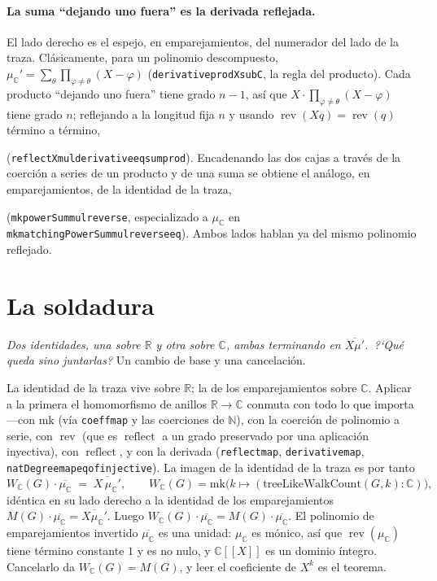 \documentclass[11pt]{article}
\newcommand{\lean}[1]{{\def\_{\textunderscore\allowbreak}\texttt{#1}}}
\newcommand{\R}{\mathbb{R}}
\newcommand{\C}{\mathbb{C}}
\newcommand{\N}{\mathbb{N}}
\DeclareMathOperator{\reflect}{reflect}
\DeclareMathOperator{\rev}{rev}
\providecommand{\llbracket}{[\![}
\providecommand{\rrbracket}{]\!]}
\newcommand{\keyeq}[1]{\begin{center}\keybox{$\displaystyle #1$}\end{center}}
\begin{document}
\paragraph{La suma ``dejando uno fuera'' es la derivada reflejada.} El lado derecho es el espejo, en
emparejamientos, del numerador del lado de la traza. Cl\'asicamente, para un polinomio descompuesto,
$\mu_\C'=\sum_\theta\prod_{\varphi\neq\theta}(X-\varphi)$ (\lean{derivative\_prod\_X\_sub\_C}, la regla
del producto). Cada producto ``dejando uno fuera'' tiene grado $n-1$, as\'i que
$X\cdot\prod_{\varphi\neq\theta}(X-\varphi)$ tiene grado $n$; reflejando a la longitud fija $n$ y
usando $\rev(Xq)=\rev(q)$ t\'ermino a t\'ermino,
\keyeq{\sum_\theta\prod_{\varphi\neq\theta}(1-\varphi X)\;=\;\reflect_n\!\bigl(X\,\mu_\C'\bigr)}
(\lean{reflect\_X\_mul\_derivative\_eq\_sum\_prod}). Encadenando las dos cajas a trav\'es de la
coerci\'on a series de un producto y de una suma se obtiene el an\'alogo, en emparejamientos, de la
identidad de la traza,
\keyeq{M(G)\cdot\overline{\mu_\C}\;=\;\overline{X\,\mu_\C'}}
(\lean{mk\_powerSum\_mul\_reverse}, especializado a $\mu_\C$ en
\lean{mk\_matchingPowerSum\_mul\_reverse\_eq}). Ambos lados hablan ya del mismo polinomio reflejado.

\section{La soldadura}
\label{sec:weld}

\emph{Dos identidades, una sobre $\R$ y otra sobre $\C$, ambas terminando en $\overline{X\mu'}$.
\,?`Qu\'e queda sino juntarlas?} Un cambio de base y una cancelaci\'on.

La identidad de la traza vive sobre $\R$; la de los emparejamientos sobre $\C$. Aplicar a la primera el
homomorfismo de anillos $\R\to\C$ conmuta con todo lo que importa---con $\mathrm{mk}$ (v\'ia
\lean{coeff\_map} y las coerciones de $\N$), con la coerci\'on de polinomio a serie, con $\rev$ (que es
$\reflect$ a un grado preservado por una aplicaci\'on inyectiva), con $\reflect$, y con la derivada
(\lean{reflect\_map}, \lean{derivative\_map}, \lean{natDegree\_map\_eq\_of\_injective}). La imagen de la
identidad de la traza es por tanto
\[
  W_\C(G)\cdot\overline{\mu_\C}\;=\;\overline{X\,\mu_\C'},
  \qquad W_\C(G)=\mathrm{mk}\bigl(k\mapsto(\mathrm{treeLikeWalkCount}(G,k):\C)\bigr),
\]
id\'entica en su lado derecho a la identidad de los emparejamientos
$M(G)\cdot\overline{\mu_\C}=\overline{X\mu_\C'}$. Luego
$W_\C(G)\cdot\overline{\mu_\C}=M(G)\cdot\overline{\mu_\C}$. El polinomio de emparejamientos invertido
$\overline{\mu_\C}$ es una unidad: $\mu_\C$ es m\'onico, as\'i que $\rev(\mu_\C)$ tiene t\'ermino
constante $1$ y es no nulo, y $\C\llbracket X\rrbracket$ es un dominio \'integro. Cancelarlo da
$W_\C(G)=M(G)$, y leer el coeficiente de $X^k$ es el teorema.
\end{document}
